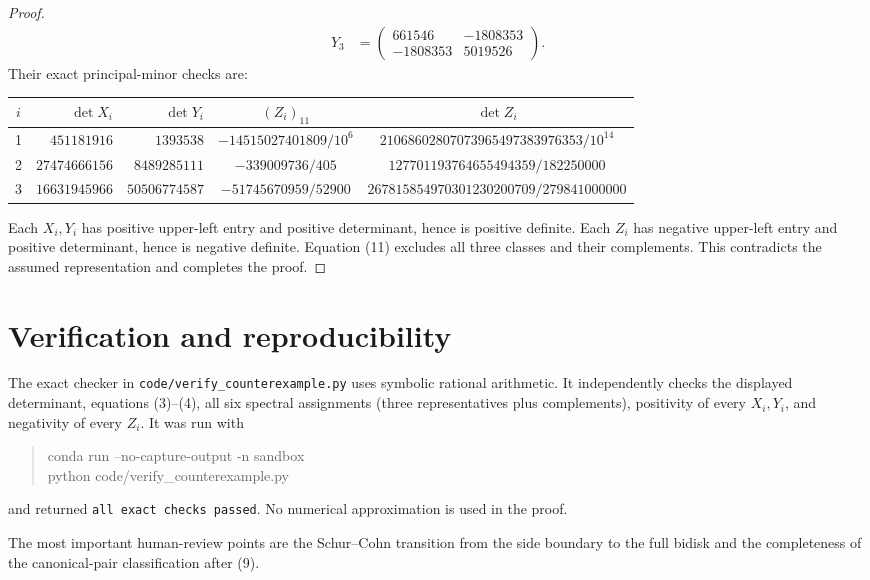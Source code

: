 \documentclass[11pt]{article}
\begin{document}
\begin{proof}
\begin{align*}
Y_3&=\begin{pmatrix}661546&-1808353\\-1808353&5019526\end{pmatrix}.
\end{align*}
Their exact principal-minor checks are:
\begin{center}
\small
\begin{tabular}{c r r c c}
\toprule
$i$ & $\det X_i$ & $\det Y_i$ & $(Z_i)_{11}$ & $\det Z_i$\\
\midrule
1 & $451181916$ & $1393538$ & $-14515027401809/10^6$ & $21068602807073965497383976353/10^{14}$\\
2 & $27474666156$ & $8489285111$ & $-339009736/405$ & $127701193764655494359/182250000$\\
3 & $16631945966$ & $50506774587$ & $-51745670959/52900$ & $267815854970301230200709/279841000000$\\
\bottomrule
\end{tabular}
\end{center}
Each $X_i,Y_i$ has positive upper-left entry and positive determinant, hence is positive definite.  Each $Z_i$ has negative upper-left entry and positive determinant, hence is negative definite.  Equation (11) excludes all three classes and their complements.  This contradicts the assumed representation and completes the proof.
\end{proof}

\section*{Verification and reproducibility}
The exact checker in \texttt{code/verify\_counterexample.py} uses symbolic rational arithmetic.  It independently checks the displayed determinant, equations (3)--(4), all six spectral assignments (three representatives plus complements), positivity of every $X_i,Y_i$, and negativity of every $Z_i$.  It was run with
\begin{quote}\small\ttfamily
conda run --no-capture-output -n sandbox\\
python code/verify\_counterexample.py
\end{quote}
and returned \texttt{all exact checks passed}.  No numerical approximation is used in the proof.

The most important human-review points are the Schur--Cohn transition from the side boundary to the full bidisk and the completeness of the canonical-pair classification after (9).
\end{document}
